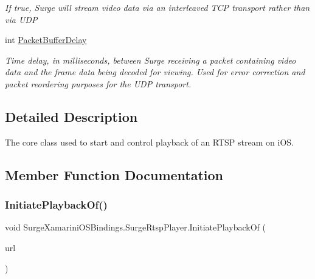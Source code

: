 \begin{DoxyCompactItemize}
\begin{DoxyCompactList}\small\item\em If true, Surge will stream video data via an interleaved T\+CP transport rather than via U\+DP \end{DoxyCompactList}\item 
int \hyperlink{interface_surge_xamarini_o_s_bindings_1_1_surge_rtsp_player_ab7f5f050c331469cce2e89cc8e2ad496}{Packet\+Buffer\+Delay}
\begin{DoxyCompactList}\small\item\em Time delay, in milliseconds, between Surge receiving a packet containing video data and the frame data being decoded for viewing. Used for error correction and packet reordering purposes for the U\+DP transport. \end{DoxyCompactList}\end{DoxyCompactItemize}


\subsection{Detailed Description}
The core class used to start and control playback of an R\+T\+SP stream on i\+OS. 



\subsection{Member Function Documentation}
\mbox{\label{interface_surge_xamarini_o_s_bindings_1_1_surge_rtsp_player_a7c2572b559c1758415a21c0bde4417be}} 
\subsubsection{\texorpdfstring{Initiate\+Playback\+Of()}{InitiatePlaybackOf()}\hspace{0.1cm}{\footnotesize\ttfamily [1/3]}}
{\footnotesize\ttfamily void Surge\+Xamarini\+O\+S\+Bindings.\+Surge\+Rtsp\+Player.\+Initiate\+Playback\+Of (\begin{DoxyParamCaption}\item[{N\+S\+Url}]{url }\end{DoxyParamCaption})}



